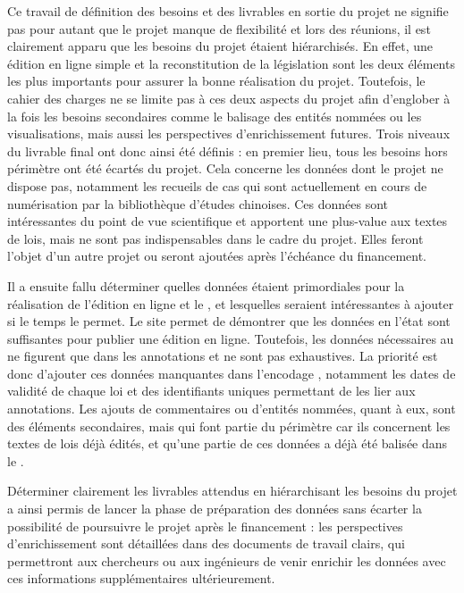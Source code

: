Ce travail de définition des besoins et des livrables en sortie du projet ne signifie pas pour autant que le projet manque de flexibilité et lors des réunions, il est clairement apparu que les besoins du projet étaient hiérarchisés. En effet, une édition en ligne simple et la reconstitution de la législation sont les deux éléments les plus importants pour assurer la bonne réalisation du projet. Toutefois, le cahier des charges ne se limite pas à ces deux aspects du projet afin d'englober à la fois les besoins secondaires comme le balisage des entités nommées ou les visualisations, mais aussi les perspectives d'enrichissement futures. Trois niveaux du livrable final ont donc ainsi été définis : en premier lieu, tous les besoins hors périmètre ont été écartés du projet. Cela concerne les données dont le projet ne dispose pas, notamment les recueils de cas qui sont actuellement en cours de numérisation par la bibliothèque d'études chinoises. Ces données sont intéressantes du point de vue scientifique et apportent une plus-value aux textes de lois, mais ne sont pas indispensables dans le cadre du projet. Elles feront l'objet d'un autre projet ou seront ajoutées après l'échéance du financement. 

Il a ensuite fallu déterminer quelles données étaient primordiales pour la réalisation de l'édition en ligne et le \cv, et lesquelles seraient intéressantes à ajouter si le temps le permet. Le site \LSC permet de démontrer que les données en l'état sont suffisantes pour publier une édition en ligne. Toutefois, les données nécessaires au \cv ne figurent que dans les annotations et ne sont pas exhaustives. La priorité est donc d'ajouter ces données manquantes dans l'encodage \TEI, notamment les dates de validité de chaque loi et des identifiants uniques permettant de les lier aux annotations. Les ajouts de commentaires ou d'entités nommées, quant à eux, sont des éléments secondaires, mais qui font partie du périmètre car ils concernent les textes de lois déjà édités, et qu'une partie de ces données a déjà été balisée dans le \XML. 

Déterminer clairement les livrables attendus en hiérarchisant les besoins du projet a ainsi permis de lancer la phase de préparation des données sans écarter la possibilité de poursuivre le projet après le financement : les perspectives d'enrichissement sont détaillées dans des documents de travail clairs, qui permettront aux chercheurs ou aux ingénieurs de venir enrichir les données avec ces informations supplémentaires ultérieurement.

